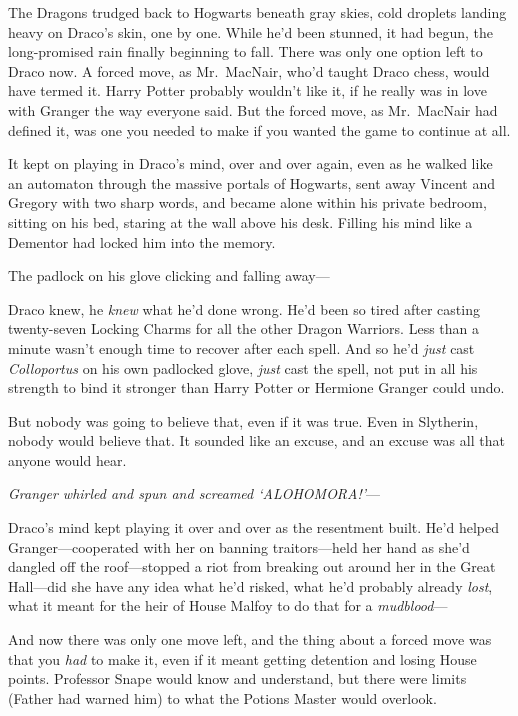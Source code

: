 The Dragons trudged back to Hogwarts beneath gray skies, cold droplets landing 
heavy on Draco's skin, one by one. While he'd been stunned, it had begun, the 
long-promised rain finally beginning to fall. There was only one option left to 
Draco now. A forced move, as Mr.~MacNair, who'd taught Draco chess, would have 
termed it. Harry Potter probably wouldn't like it, if he really was in love 
with Granger the way everyone said. But the forced move, as Mr.~MacNair had 
defined it, was one you needed to make if you wanted the game to continue at 
all.

It kept on playing in Draco's mind, over and over again, even as he walked like 
an automaton through the massive portals of Hogwarts, sent away Vincent and 
Gregory with two sharp words, and became alone within his private bedroom, 
sitting on his bed, staring at the wall above his desk. Filling his mind like a 
Dementor had locked him into the memory.

The padlock on his glove clicking and falling away---

Draco knew, he \emph{knew} what he'd done wrong. He'd been so tired after 
casting twenty-seven Locking Charms for all the other Dragon Warriors. Less 
than a minute wasn't enough time to recover after each spell. And so he'd 
\emph{just} cast \emph{Colloportus} on his own padlocked glove, \emph{just} 
cast the spell, not put in all his strength to bind it stronger than Harry 
Potter or Hermione Granger could undo.

But nobody was going to believe that, even if it was true. Even in Slytherin, 
nobody would believe that. It sounded like an excuse, and an excuse was all 
that anyone would hear.

\emph{Granger whirled and spun and screamed `ALOHOMORA!'}---

Draco's mind kept playing it over and over as the resentment built. He'd helped 
Granger---cooperated with her on banning traitors---held her hand as she'd 
dangled off the roof---stopped a riot from breaking out around her in the Great 
Hall---did she have any idea what he'd risked, what he'd probably already 
\emph{lost}, what it meant for the heir of House Malfoy to do that for a 
\emph{mudblood}---

And now there was only one move left, and the thing about a forced move was 
that you \emph{had} to make it, even if it meant getting detention and losing 
House points. Professor Snape would know and understand, but there were limits 
(Father had warned him) to what the Potions Master would overlook.

